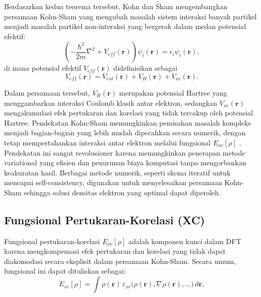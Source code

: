 Berdasarkan kedua teorema tersebut, Kohn dan Sham mengembangkan persamaan Kohn-Sham yang mengubah masalah sistem interaksi banyak partikel menjadi masalah partikel non-interaksi yang bergerak dalam medan potensial efektif:
\begin{equation}
    \left(-\frac{\hbar^2}{2m}\nabla^2 + V_{eff}(\mathbf{r})\right)\psi_i(\mathbf{r}) = \epsilon_i \psi_i(\mathbf{r}),
\end{equation}
di mana potensial efektif \(V_{eff}(\mathbf{r})\) didefinisikan sebagai
\begin{equation}
    V_{eff}(\mathbf{r}) = V_{ext}(\mathbf{r}) + V_H(\mathbf{r}) + V_{xc}(\mathbf{r}).
 \end{equation}

Dalam persamaan tersebut, \(V_H(\mathbf{r})\) merupakan potensial Hartree yang menggambarkan interaksi Coulomb klasik antar elektron, sedangkan \(V_{xc}(\mathbf{r})\) mengakumulasi efek pertukaran dan korelasi yang tidak tercakup oleh potensial Hartree. Pendekatan Kohn-Sham memungkinkan pemisahan masalah kompleks menjadi bagian-bagian yang lebih mudah dipecahkan secara numerik, dengan tetap mempertahankan interaksi antar elektron melalui fungsional \(E_{xc}[\rho]\) \citep{Kohn1965, Perdew1996}. Pendekatan ini sangat revolusioner karena memungkinkan penerapan metode variational yang efisien dan penurunan biaya komputasi tanpa mengorbankan keakuratan hasil. Berbagai metode numerik, seperti skema iteratif untuk mencapai self-consistency, digunakan untuk menyelesaikan persamaan Kohn-Sham sehingga solusi densitas elektron yang optimal dapat diperoleh. \subsection{Fungsional Pertukaran-Korelasi (XC)}
Fungsional pertukaran-korelasi \(E_{xc}[\rho]\) adalah komponen kunci dalam DFT karena mengkompensasi efek pertukaran dan korelasi yang tidak dapat diakomodasi secara eksplisit dalam persamaan Kohn-Sham. Secara umum, fungsional ini dapat dituliskan sebagai:
\begin{equation}
    E_{xc}[\rho] = \int \rho(\mathbf{r})\,\varepsilon_{xc}\Big(\rho(\mathbf{r}), \nabla\rho(\mathbf{r}), \ldots\Big) \, d\mathbf{r},
\end{equation}
